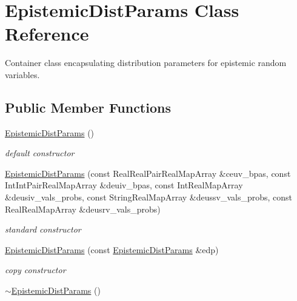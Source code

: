 \section{Epistemic\+Dist\+Params Class Reference}
\label{classPecos_1_1EpistemicDistParams}


Container class encapsulating distribution parameters for epistemic random variables.  


\subsection*{Public Member Functions}
\begin{DoxyCompactItemize}
\item 
\hyperlink{classPecos_1_1EpistemicDistParams_a5c947f7c65c8d4bd42e89d30c21d0ee5}{Epistemic\+Dist\+Params} ()\label{classPecos_1_1EpistemicDistParams_a5c947f7c65c8d4bd42e89d30c21d0ee5}

\begin{DoxyCompactList}\small\item\em default constructor \end{DoxyCompactList}\item 
\hyperlink{classPecos_1_1EpistemicDistParams_a80c694a3f408daeb46249fea90258381}{Epistemic\+Dist\+Params} (const Real\+Real\+Pair\+Real\+Map\+Array \&ceuv\+\_\+bpas, const Int\+Int\+Pair\+Real\+Map\+Array \&deuiv\+\_\+bpas, const Int\+Real\+Map\+Array \&deusiv\+\_\+vals\+\_\+probs, const String\+Real\+Map\+Array \&deussv\+\_\+vals\+\_\+probs, const Real\+Real\+Map\+Array \&deusrv\+\_\+vals\+\_\+probs)\label{classPecos_1_1EpistemicDistParams_a80c694a3f408daeb46249fea90258381}

\begin{DoxyCompactList}\small\item\em standard constructor \end{DoxyCompactList}\item 
\hyperlink{classPecos_1_1EpistemicDistParams_a51140bd8c73fc26045fef144d105f03c}{Epistemic\+Dist\+Params} (const \hyperlink{classPecos_1_1EpistemicDistParams}{Epistemic\+Dist\+Params} \&edp)\label{classPecos_1_1EpistemicDistParams_a51140bd8c73fc26045fef144d105f03c}

\begin{DoxyCompactList}\small\item\em copy constructor \end{DoxyCompactList}\item 
\hyperlink{classPecos_1_1EpistemicDistParams_a78317b2e084d2b5f6393353706674649}{$\sim$\+Epistemic\+Dist\+Params} ()\label{classPecos_1_1EpistemicDistParams_a78317b2e084d2b5f6393353706674649}


\end{DoxyCompactItemize}
